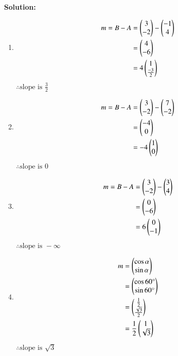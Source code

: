 \documentclass[journal]{IEEEtran}
\begin{document}
\textbf{Solution: }\\
\begin{enumerate}
	\item{
			\begin{align} m = B-A &= \begin{pmatrix}3 \\ -2\end{pmatrix} - \begin{pmatrix}-1 \\ 4\end{pmatrix} \\
				&= \begin{pmatrix}4 \\ -6\end{pmatrix} \\
				&= 4\begin{pmatrix}1 \\ \frac{-3}{2}\end{pmatrix}
		\end{align}
		$\therefore \text{slope is } \frac{3}{2}$
	}
	\item{
			\begin{align} m = B-A &= \begin{pmatrix}3 \\ -2\end{pmatrix} - \begin{pmatrix}7 \\ -2\end{pmatrix} \\
				&= \begin{pmatrix}-4 \\ 0\end{pmatrix} \\
				&= -4\begin{pmatrix}1 \\ 0\end{pmatrix}
		\end{align}
		$\therefore \text{slope is } 0$
	}
	\item{
			\begin{align} m = B-A &= \begin{pmatrix}3 \\ -2\end{pmatrix} - \begin{pmatrix}3 \\ 4\end{pmatrix} \\
				&= \begin{pmatrix}0 \\ -6\end{pmatrix} \\
				&= 6\begin{pmatrix}0 \\ -1\end{pmatrix}
		\end{align}
		$\therefore \text{slope is } -\infty$
	}
	\item{
			\begin{align} m &= \begin{pmatrix}\cos \alpha \\ \sin \alpha\end{pmatrix} \\
				&= \begin{pmatrix}\cos 60\degree \\ \sin 60\degree\end{pmatrix} \\
				&= \begin{pmatrix}\frac{1}{2} \\ \frac{\sqrt{3}}{2}\end{pmatrix} \\
				&= \frac{1}{2} \begin{pmatrix}1 \\ \sqrt{3}\end{pmatrix}
		\end{align}
		$\therefore \text{slope is } \sqrt{3}$
	}
\end{enumerate}
\end{document}
